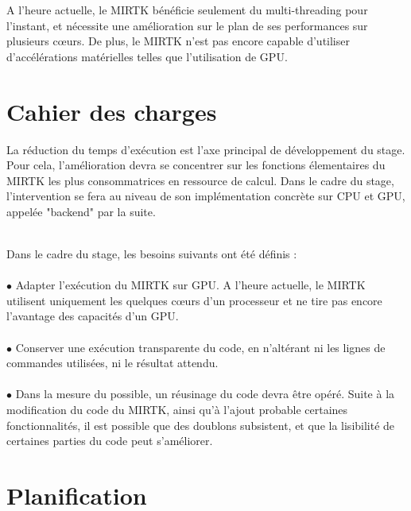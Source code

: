 \documentclass[10pt]{report}
\begin{document}
	A l'heure actuelle, le MIRTK bénéficie seulement du multi-threading pour l'instant, et nécessite une amélioration sur le plan de ses performances sur plusieurs cœurs. De plus,  le MIRTK n'est pas encore capable d'utiliser d'accélérations matérielles telles que l'utilisation de GPU.
	\newpage
	\section{Cahier des charges}
	La réduction du temps d'exécution est l'axe principal de développement du stage. Pour cela, l'amélioration devra se concentrer sur les fonctions élementaires du MIRTK les plus consommatrices en ressource de calcul. Dans le cadre du stage, l'intervention se fera au niveau de son implémentation concrète sur CPU et GPU, appelée "backend" par la suite.\\ ~\par
	
	\noindent Dans le cadre du stage, les besoins suivants ont été définis : \\
	\\{$\bullet$} Adapter l'exécution du MIRTK sur GPU. A l'heure actuelle, le MIRTK utilisent uniquement les quelques cœurs d'un processeur et ne tire pas encore l'avantage des capacités d'un GPU.\\
	\\{$\bullet$} Conserver une exécution transparente du code, en n'altérant ni les lignes de commandes utilisées, ni le résultat attendu.  \\
	\\{$\bullet$} Dans la mesure du possible, un réusinage du code devra être opéré. Suite à la modification du code du MIRTK, ainsi qu'à l'ajout probable certaines fonctionnalités, il est possible que des doublons subsistent, et que la lisibilité de certaines parties du code peut s'améliorer.	
	\section{Planification}
\end{document}
